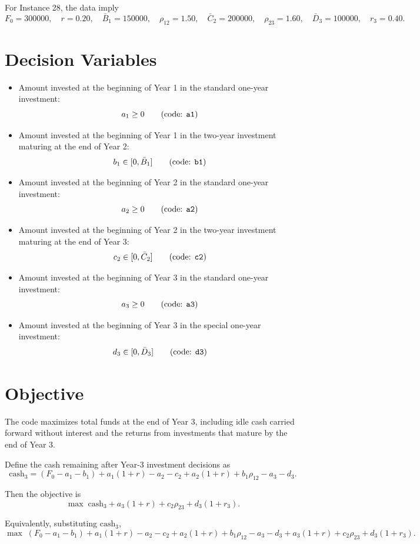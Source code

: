 For Instance 28, the data imply
\[
F_0=300000,\quad r=0.20,\quad \bar B_1=150000,\quad \rho_{12}=1.50,\quad
\bar C_2=200000,\quad \rho_{23}=1.60,\quad \bar D_3=100000,\quad r_3=0.40.
\]

\section*{Decision Variables}

\begin{itemize}
    \item Amount invested at the beginning of Year 1 in the standard one-year investment:
    \[
    a_1 \ge 0 \qquad (\text{code: \texttt{a1}})
    \]
    \item Amount invested at the beginning of Year 1 in the two-year investment maturing at the end of Year 2:
    \[
    b_1 \in [0,\bar B_1] \qquad (\text{code: \texttt{b1}})
    \]
    \item Amount invested at the beginning of Year 2 in the standard one-year investment:
    \[
    a_2 \ge 0 \qquad (\text{code: \texttt{a2}})
    \]
    \item Amount invested at the beginning of Year 2 in the two-year investment maturing at the end of Year 3:
    \[
    c_2 \in [0,\bar C_2] \qquad (\text{code: \texttt{c2}})
    \]
    \item Amount invested at the beginning of Year 3 in the standard one-year investment:
    \[
    a_3 \ge 0 \qquad (\text{code: \texttt{a3}})
    \]
    \item Amount invested at the beginning of Year 3 in the special one-year investment:
    \[
    d_3 \in [0,\bar D_3] \qquad (\text{code: \texttt{d3}})
    \]
\end{itemize}

\section*{Objective}

The code maximizes total funds at the end of Year 3, including idle cash carried forward without interest and the returns from investments that mature by the end of Year 3.

Define the cash remaining after Year-3 investment decisions as
\[
\text{cash}_3
=
(F_0-a_1-b_1)+a_1(1+r)-a_2-c_2+a_2(1+r)+b_1\rho_{12}-a_3-d_3.
\]

Then the objective is
\[
\max \;
\text{cash}_3 + a_3(1+r) + c_2\rho_{23} + d_3(1+r_3).
\]

Equivalently, substituting \(\text{cash}_3\),
\[
\max \;
(F_0-a_1-b_1)+a_1(1+r)-a_2-c_2+a_2(1+r)+b_1\rho_{12}-a_3-d_3
+ a_3(1+r) + c_2\rho_{23} + d_3(1+r_3).
\]

